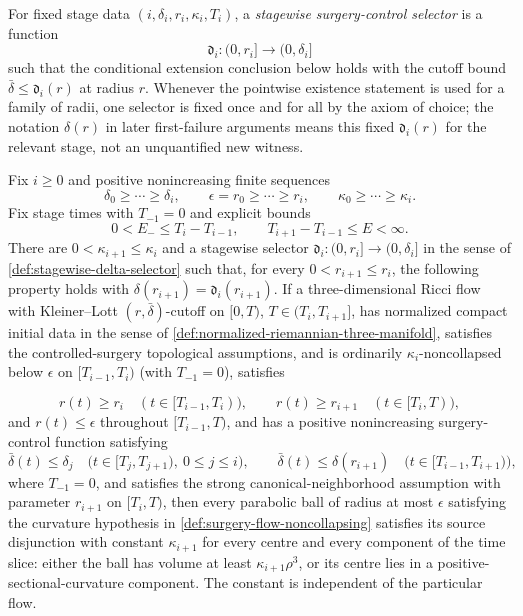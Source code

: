 \begin{definition}
\label{def:stagewise-delta-selector}
\notready
For fixed stage data $(i,\delta_i,r_i,\kappa_i,T_i)$, a
\emph{stagewise surgery-control selector} is a function
\[
 \mathfrak d_i:(0,r_i]\longrightarrow(0,\delta_i]
\]
such that the conditional extension conclusion below holds with the cutoff
bound $\bar\delta\le\mathfrak d_i(r)$ at radius $r$.  Whenever the
pointwise existence statement is used for a family of radii, one selector is
fixed once and for all by the axiom of choice; the notation
$\delta(r)$ in later first-failure arguments means this fixed
$\mathfrak d_i(r)$ for the relevant stage, not an unquantified new witness.
\end{definition}

\begin{theorem}
\label{thm:conditional-noncollapsing-extension}
\notready
Fix $i\ge0$ and positive nonincreasing finite sequences
\[
\delta_0\ge\cdots\ge\delta_i,
\qquad \epsilon=r_0\ge\cdots\ge r_i,
\qquad \kappa_0\ge\cdots\ge\kappa_i.
\]
Fix stage times with $T_{-1}=0$ and explicit bounds
\[
 0<E_-\le T_i-T_{i-1},\qquad T_{i+1}-T_{i-1}\le E<\infty.
\]
There are $0<\kappa_{i+1}\le\kappa_i$ and a stagewise selector
$\mathfrak d_i:(0,r_i]\to(0,\delta_i]$ in the sense of
\ref{def:stagewise-delta-selector} such that, for every
$0<r_{i+1}\le r_i$, the following property holds with
$\delta(r_{i+1})=\mathfrak d_i(r_{i+1})$.  If a
three-dimensional Ricci flow with Kleiner--Lott $(r,\bar\delta)$-cutoff on
$[0,T)$, $T\in(T_i,T_{i+1}]$, has normalized compact initial data in the
sense of \ref{def:normalized-riemannian-three-manifold}, satisfies the
controlled-surgery topological assumptions, and is ordinarily
  $\kappa_i$-noncollapsed below $\epsilon$ on
  $[T_{i-1},T_i)$ (with $T_{-1}=0$), satisfies

  \[
   r(t)\ge r_i\quad(t\in[T_{i-1},T_i)),
   \qquad
   r(t)\ge r_{i+1}\quad(t\in[T_i,T)),
  \]
  and $r(t)\le\epsilon$ throughout $[T_{i-1},T)$,
  and has a positive nonincreasing
  surgery-control function satisfying
\[
 \bar\delta(t)\le\delta_j
 \quad\bigl(t\in[T_j,T_{j+1}),\ 0\le j\le i\bigr),
 \qquad
 \bar\delta(t)\le\delta(r_{i+1})
 \quad\bigl(t\in[T_{i-1},T_{i+1})\bigr),
\]
  where $T_{-1}=0$, and satisfies the strong canonical-neighborhood
  assumption with parameter $r_{i+1}$ on $[T_i,T)$, then every parabolic ball
  of radius at most
  $\epsilon$ satisfying the curvature hypothesis in
\ref{def:surgery-flow-noncollapsing} satisfies its source disjunction with
constant $\kappa_{i+1}$ for every centre and every component of the time slice:
either the ball has volume at least $\kappa_{i+1}\rho^3$, or its centre lies in
a positive-sectional-curvature component.  The constant is independent of the
particular flow.
\end{theorem}

